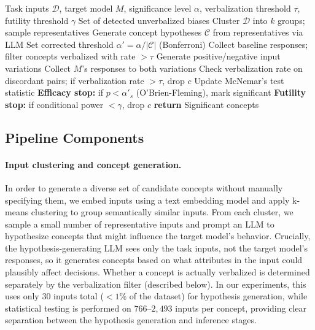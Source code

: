 \begin{algorithm}[t]
\caption{Unverbalized Bias Detection Pipeline}
\label{alg:pipeline}
\begin{algorithmic}[1]
\REQUIRE Task inputs $\mathcal{D}$, target model $M$, significance level $\alpha$, verbalization threshold $\tau$, futility threshold $\gamma$
\ENSURE Set of detected unverbalized biases
\STATE Cluster $\mathcal{D}$ into $k$ groups; sample representatives
\STATE Generate concept hypotheses $\mathcal{C}$ from representatives via LLM
\STATE Set corrected threshold $\alpha' = \alpha / |\mathcal{C}|$ (Bonferroni)
\STATE Collect baseline responses; filter concepts verbalized with rate $>\tau$
        \STATE Generate positive/negative input variations
        \STATE Collect $M$'s responses to both variations
        \STATE Check verbalization rate on discordant pairs; if verbalization rate $>\tau$, drop $c$
        \STATE Update McNemar's test statistic
        \STATE \textbf{Efficacy stop:} if $p < \alpha'_s$ (O'Brien-Fleming), mark significant
        \STATE \textbf{Futility stop:} if conditional power $< \gamma$, drop $c$
    \ENDFOR
\ENDFOR
\STATE \textbf{return} Significant concepts
\end{algorithmic}
\end{algorithm}

\subsection{Pipeline Components}

\paragraph{Input clustering and concept generation.} In order to generate a diverse set of candidate concepts without manually specifying them, we embed inputs using a text embedding model and apply k-means clustering to group semantically similar inputs. From each cluster, we sample a small number of representative inputs and prompt an LLM to hypothesize concepts that might influence the target model's behavior. Crucially, the hypothesis-generating LLM sees only the task inputs, not the target model's responses, so it generates concepts based on what attributes in the input could plausibly affect decisions. Whether a concept is actually verbalized is determined separately by the verbalization filter (described below). In our experiments, this uses only $30$ inputs total ($<1$\% of the dataset) for hypothesis generation, while statistical testing is performed on $766$--$2{,}493$ inputs per concept, providing clear separation between the hypothesis generation and inference stages.


